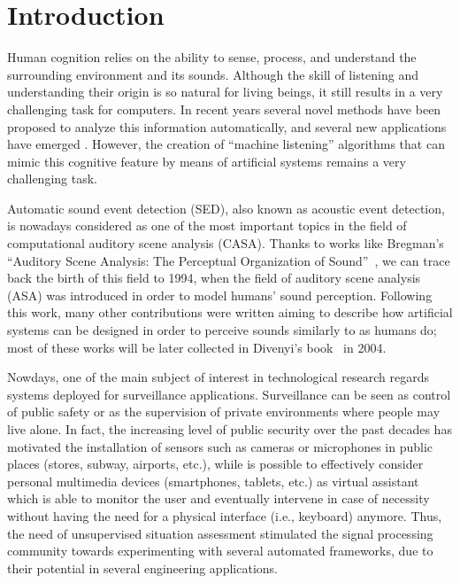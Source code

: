 \chapter{Introduction}\label{ch:intro}

Human cognition relies on the ability to sense, process, and understand the surrounding environment and its sounds.
Although the skill of listening and understanding their origin is so natural for living beings, it still results in a very challenging task for computers. In recent years several novel methods have been proposed to analyze this information automatically, and several new applications have emerged \cite{virtanen2018computational}. However, the creation of ``machine listening'' algorithms that can mimic this cognitive feature by means of artificial systems remains a very challenging task. 

Automatic sound event detection (SED), also known as acoustic event detection, is nowadays considered as one of the most important topics in the field of computational auditory scene analysis (CASA). Thanks to works like Bregman's ``Auditory Scene Analysis: The Perceptual Organization of Sound''~\cite{bregman1994auditory}, we can trace back the birth of this field to 1994, when the field of auditory scene analysis (ASA) was introduced in order to model humans' sound perception. Following this work, many other contributions were written aiming to describe how artificial systems can be designed in order to perceive sounds similarly to as humans do; most of these works will be later collected in Divenyi's book~\cite{divenyi2004speech} in 2004.

Nowdays, one of the main subject of interest in technological research regards systems deployed for surveillance applications. Surveillance can be seen as control of public safety or as the supervision of private environments where people may live alone. 
In fact, the increasing level of public security over the past decades has motivated the installation of sensors such as cameras or microphones in public places (stores, subway, airports, etc.), while is possible to effectively consider personal multimedia devices (smartphones, tablets, etc.) as virtual assistant which is able to monitor the user and eventually intervene in case of necessity without having the need for a physical interface (i.e., keyboard) anymore.
Thus, the need of unsupervised situation assessment stimulated the signal processing community towards experimenting with several automated frameworks, due to their potential in several engineering applications.

